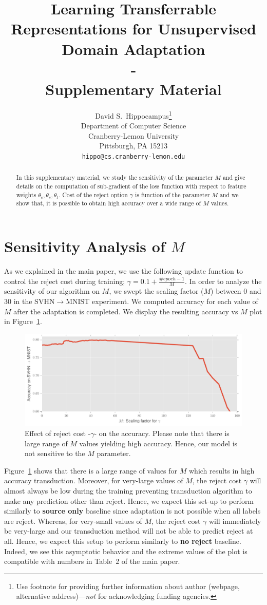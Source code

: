 \documentclass{article}
\title{Learning Transferrable Representations for Unsupervised Domain Adaptation \\ -  \\Supplementary Material}
\author{
  David S.~Hippocampus\thanks{Use footnote for providing further
    information about author (webpage, alternative
    address)---\emph{not} for acknowledging funding agencies.} \\
  Department of Computer Science\\
  Cranberry-Lemon University\\
  Pittsburgh, PA 15213 \\
  \texttt{hippo@cs.cranberry-lemon.edu} \\
}
\begin{document}
 

\maketitle

\begin{abstract} 
In this supplementary material, we study the sensitivity of the parameter $M$ and give details on the computation of sub-gradient of the loss function with respect to feature weights $\theta_c,\theta_s,\theta_t$. Cost of the reject option $\gamma$ is function of the parameter $M$ and we show that, it is possible to obtain high accuracy over a wide range of $M$ values.
\end{abstract} 

\section{Sensitivity Analysis of $M$}
As we explained in the main paper, we use the following update function to control the reject cost during training; $\gamma = 0.1 + \frac{\#epoch -1}{M}$. In order to analyze the sensitivity of our algorithm on $M$, we swept the scaling factor ($M$) between 0 and 30 in the SVHN$\rightarrow$MNIST experiment. We computed accuracy for each value of $M$ after the adaptation is completed. We display the resulting accuracy vs $M$ plot in Figure~\ref{sens}.



\begin{figure}[h]
\includegraphics[width=\textwidth]{a.pdf}
\caption{Effect of reject cost -$\gamma$- on the accuracy. Please note that there is large range of $M$ values yielding high accuracy. Hence, our model is not sensitive to the $M$ parameter.}
\label{sens}
\end{figure}

Figure~\ref{sens} shows that there is a large range of values for $M$ which results in high accuracy transduction. Moreover, for very-large values of $M$, the reject cost $\gamma$ will almost always be low during the training preventing transduction algorithm to make any prediction other than reject. Hence, we expect this set-up to perform similarly to \textbf{source only} baseline since adaptation is not possible when all labels are reject. Whereas, for very-small values of $M$, the reject cost $\gamma$ will immediately be very-large and our transduction method will not be able to predict reject at all. Hence, we expect this setup to perform similarly to \textbf{no reject} baseline. Indeed, we see this asymptotic behavior and the extreme values of the plot is compatible with numbers in Table~2 of the main paper.
\end{document}
